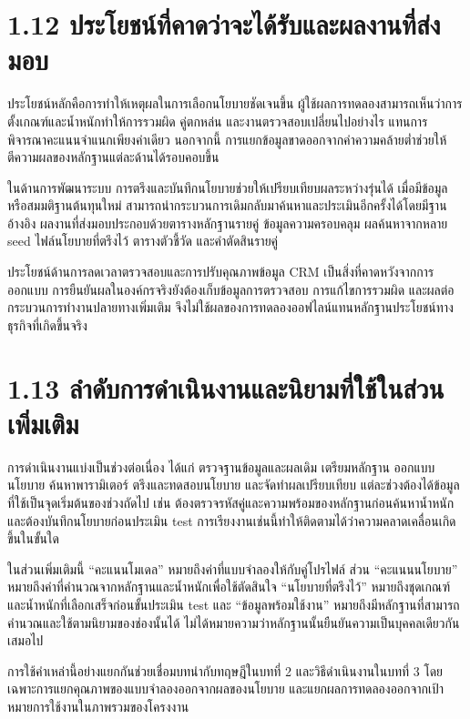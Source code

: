 \section*{1.12 ประโยชน์ที่คาดว่าจะได้รับและผลงานที่ส่งมอบ}
ประโยชน์หลักคือการทำให้เหตุผลในการเลือกนโยบายชัดเจนขึ้น ผู้ใช้ผลการทดลองสามารถเห็นว่าการตั้งเกณฑ์และน้ำหนักทำให้การรวมผิด คู่ตกหล่น และงานตรวจสอบเปลี่ยนไปอย่างไร แทนการพิจารณาคะแนนจำแนกเพียงค่าเดียว นอกจากนี้ การแยกข้อมูลขาดออกจากค่าความคล้ายต่ำช่วยให้ตีความผลของหลักฐานแต่ละด้านได้รอบคอบขึ้น

ในด้านการพัฒนาระบบ การตรึงและบันทึกนโยบายช่วยให้เปรียบเทียบผลระหว่างรุ่นได้ เมื่อมีข้อมูลหรือสมมติฐานต้นทุนใหม่ สามารถนำกระบวนการเดิมกลับมาค้นหาและประเมินอีกครั้งได้โดยมีฐานอ้างอิง ผลงานที่ส่งมอบประกอบด้วยตารางหลักฐานรายคู่ ข้อมูลความครอบคลุม ผลค้นหาจากหลาย seed ไฟล์นโยบายที่ตรึงไว้ ตารางตัวชี้วัด และคำตัดสินรายคู่

ประโยชน์ด้านการลดเวลาตรวจสอบและการปรับคุณภาพข้อมูล CRM เป็นสิ่งที่คาดหวังจากการออกแบบ การยืนยันผลในองค์กรจริงยังต้องเก็บข้อมูลการตรวจสอบ การแก้ไขการรวมผิด และผลต่อกระบวนการทำงานปลายทางเพิ่มเติม จึงไม่ใช้ผลของการทดลองออฟไลน์แทนหลักฐานประโยชน์ทางธุรกิจที่เกิดขึ้นจริง

\section*{1.13 ลำดับการดำเนินงานและนิยามที่ใช้ในส่วนเพิ่มเติม}
การดำเนินงานแบ่งเป็นช่วงต่อเนื่อง ได้แก่ ตรวจฐานข้อมูลและผลเดิม เตรียมหลักฐาน ออกแบบนโยบาย ค้นหาพารามิเตอร์ ตรึงและทดสอบนโยบาย และจัดทำผลเปรียบเทียบ แต่ละช่วงต้องได้ข้อมูลที่ใช้เป็นจุดเริ่มต้นของช่วงถัดไป เช่น ต้องตรวจรหัสคู่และความพร้อมของหลักฐานก่อนค้นหาน้ำหนัก และต้องบันทึกนโยบายก่อนประเมิน test การเรียงงานเช่นนี้ทำให้ติดตามได้ว่าความคลาดเคลื่อนเกิดขึ้นในขั้นใด

ในส่วนเพิ่มเติมนี้ ``คะแนนโมเดล'' หมายถึงค่าที่แบบจำลองให้กับคู่โปรไฟล์ ส่วน ``คะแนนนโยบาย'' หมายถึงค่าที่คำนวณจากหลักฐานและน้ำหนักเพื่อใช้ตัดสินใจ ``นโยบายที่ตรึงไว้'' หมายถึงชุดเกณฑ์และน้ำหนักที่เลือกเสร็จก่อนขั้นประเมิน test และ ``ข้อมูลพร้อมใช้งาน'' หมายถึงมีหลักฐานที่สามารถคำนวณและใช้ตามนิยามของช่องนั้นได้ ไม่ได้หมายความว่าหลักฐานนั้นยืนยันความเป็นบุคคลเดียวกันเสมอไป

การใช้คำเหล่านี้อย่างแยกกันช่วยเชื่อมบทนำกับทฤษฎีในบทที่ 2 และวิธีดำเนินงานในบทที่ 3 โดยเฉพาะการแยกคุณภาพของแบบจำลองออกจากผลของนโยบาย และแยกผลการทดลองออกจากเป้าหมายการใช้งานในภาพรวมของโครงงาน
